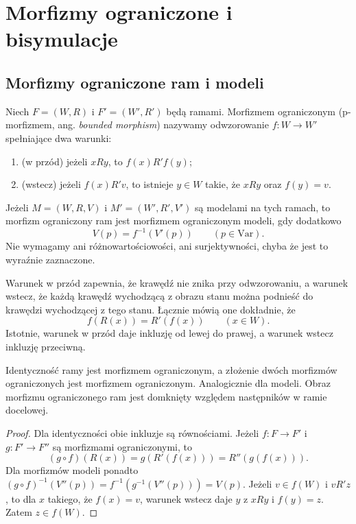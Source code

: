 \section{Morfizmy ograniczone i bisymulacje}

\subsection{Morfizmy ograniczone ram i modeli}

\begin{definicja}
\label{def:ncl-kripke-bounded-morphism}
Niech $F=(W,R)$ i $F'=(W',R')$ będą ramami.
Morfizmem ograniczonym (p-morfizmem,
ang. \emph{bounded morphism}) nazywamy
odwzorowanie $f:W\to W'$ spełniające
dwa warunki:
\begin{enumerate}
 \item (w przód) jeżeli $xRy$, to $f(x)R'f(y)$;
 \item (wstecz) jeżeli $f(x)R'v$, to istnieje
 $y\in W$ takie, że $xRy$ oraz $f(y)=v$.
\end{enumerate}
Jeżeli $M=(W,R,V)$ i $M'=(W',R',V')$
są modelami na tych ramach, to morfizm
ograniczony ram jest morfizmem ograniczonym
modeli, gdy dodatkowo
\[
 V(p)=f^{-1}(V'(p))\qquad(p\in\mathrm{Var}).
\]
Nie wymagamy ani różnowartościowości,
ani surjektywności, chyba że jest to wyraźnie
zaznaczone.
\end{definicja}

Warunek w przód zapewnia, że krawędź
nie znika przy odwzorowaniu, a warunek
wstecz, że każdą krawędź wychodzącą z obrazu
stanu można podnieść do krawędzi wychodzącej
z tego stanu. Łącznie mówią one dokładnie, że
\[
 f(R(x))=R'(f(x))\qquad(x\in W).
\]
Istotnie, warunek w przód daje inkluzję
od lewej do prawej, a warunek wstecz
inkluzję przeciwną.

\begin{stwierdzenie}
\label{prop:ncl-kripke-bounded-composition}
Identyczność ramy jest morfizmem ograniczonym,
a złożenie dwóch morfizmów ograniczonych
jest morfizmem ograniczonym.
Analogicznie dla modeli.
Obraz morfizmu ograniczonego ram jest
domknięty względem następników w ramie docelowej.
\end{stwierdzenie}
\begin{proof}
Dla identyczności obie inkluzje są równościami.
Jeżeli $f:F\to F'$ i $g:F'\to F''$
są morfizmami ograniczonymi, to
\[
 (g\circ f)(R(x))=g(R'(f(x)))
 =R''(g(f(x))).
\]
Dla morfizmów modeli ponadto
$(g\circ f)^{-1}(V''(p))
=f^{-1}(g^{-1}(V''(p)))=V(p)$.
Jeżeli $v\in f(W)$ i $vR'z$, to dla
$x$ takiego, że $f(x)=v$, warunek wstecz
daje $y$ z $xRy$ i $f(y)=z$. Zatem $z\in f(W)$.
\end{proof}

